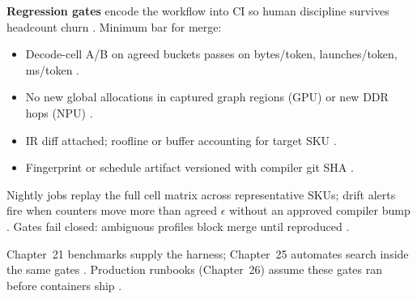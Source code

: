 \textbf{Regression gates} encode the workflow into CI so human discipline survives headcount churn \citep{chen2020compilerbasedhardw,yirage2026,patel2025llminference,memoryfloor2026,taxbreak2026,dlbook}. Minimum bar for merge:
\begin{itemize}
\item Decode-cell A/B on agreed buckets passes on bytes/token, launches/token, ms/token \citep{memoryfloor2026,taxbreak2026,patel2025llminference}.
\item No new global allocations in captured graph regions (GPU) or new DDR hops (NPU) \citep{nvidia2024cudagraphs,amd2024aie,yirage2026,kwon2023vllm}.
\item IR diff attached; roofline or buffer accounting for target SKU \citep{semianalysis2024tma,chen2020compilerbasedhardw,patel2025llminference,amd2024xdna,dlbook,dao2022flashattention,liu2024deepseekv3,dao2023flashdecoding,memoryfloor2026,taxbreak2026,nvidia2022hopper,yirage2026,amd2024aie,kwon2023vllm}.
\item Fingerprint or schedule artifact versioned with compiler git SHA \citep{yirage2026,chen2020compilerbasedhardw,kwon2023vllm,liu2024deepseekv3,patel2025llminference,memoryfloor2026,taxbreak2026,amd2024aie,dlbook,semianalysis2024tma,amd2024xdna,dao2022flashattention,dao2023flashdecoding,nvidia2024cudagraphs,nvidia2022hopper}.
\end{itemize}

Nightly jobs replay the full cell matrix across representative SKUs; drift alerts fire when counters move more than agreed $\epsilon$ without an approved compiler bump \citep{memoryfloor2026,taxbreak2026,patel2025llminference,yirage2026,chen2020compilerbasedhardw,amd2024xdna,amd2024aie,dlbook,kwon2023vllm,liu2024deepseekv3,semianalysis2024tma,dao2022flashattention,dao2023flashdecoding,nvidia2024cudagraphs,nvidia2022hopper}. Gates fail closed: ambiguous profiles block merge until reproduced \citep{patel2025llminference,yirage2026,memoryfloor2026,chen2020compilerbasedhardw,taxbreak2026,amd2024aie,dlbook,kwon2023vllm,liu2024deepseekv3,semianalysis2024tma,amd2024xdna,dao2022flashattention,dao2023flashdecoding,nvidia2024cudagraphs,nvidia2022hopper}.

Chapter~21 benchmarks supply the harness; Chapter~25 automates search inside the same gates \citep{chen2020compilerbasedhardw,yirage2026,patel2025llminference,memoryfloor2026,taxbreak2026,kwon2023vllm,liu2024deepseekv3,amd2024aie,dlbook,semianalysis2024tma,amd2024xdna,dao2022flashattention,dao2023flashdecoding,nvidia2024cudagraphs,nvidia2022hopper}. Production runbooks (Chapter~26) assume these gates ran before containers ship \citep{yirage2026,chen2020compilerbasedhardw,patel2025llminference,amd2024aie,kwon2023vllm,liu2024deepseekv3,memoryfloor2026,taxbreak2026,dlbook,semianalysis2024tma,amd2024xdna,dao2022flashattention,dao2023flashdecoding,nvidia2024cudagraphs,nvidia2022hopper}.

